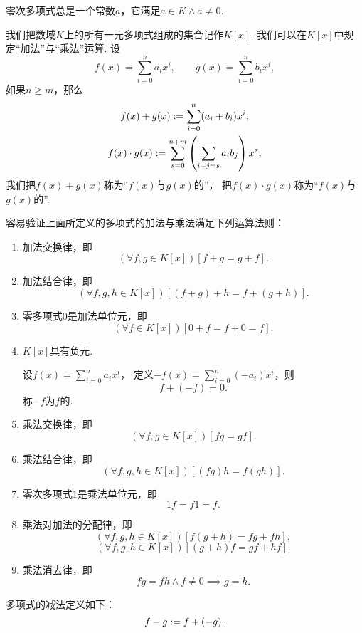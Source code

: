 零次多项式总是一个常数\(a\)，它满足\(a \in K \land a \neq 0\).

我们把数域\(K\)上的所有一元多项式组成的集合记作\(K[x]\).
我们可以在\(K[x]\)中规定“加法”与“乘法”运算.
设\[
	f(x) = \sum_{i=0}^n a_i x^i, \qquad
	g(x) = \sum_{i=0}^n b_i x^i,
\]
如果\(n \ge m\)，那么\begin{gather}
	f(x) + g(x) := \sum_{i=0}^n (a_i+b_i) x^i, \\
	f(x) \cdot g(x) := \sum_{s=0}^{n+m} \left( \sum_{i+j=s} a_i b_j \right) x^s,
\end{gather}
我们把\(f(x)+g(x)\)称为“\(f(x)\)与\(g(x)\)的”，
把\(f(x) \cdot g(x)\)称为“\(f(x)\)与\(g(x)\)的”.

容易验证上面所定义的多项式的加法与乘法满足下列运算法则：
\begin{enumerate}
	\item 加法交换律，即\[
		(\forall f,g \in K[x])[f+g=g+f].
	\]

	\item 加法结合律，即\[
		(\forall f,g,h \in K[x])[(f+g)+h=f+(g+h)].
	\]

	\item 零多项式\(0\)是加法单位元，即\[
		(\forall f \in K[x])[0+f=f+0=f].
	\]

	\item \(K[x]\)具有负元.

	设\(f(x)=\sum_{i=0}^n a_i x^i\)，
	定义\(-f(x)=\sum_{i=0}^n (-a_i) x^i\)，则\[
		f+(-f)=0.
	\]
	称\(-f\)为\(f\)的.

	\item 乘法交换律，即\[
		(\forall f,g \in K[x])[fg=gf].
	\]

	\item 乘法结合律，即\[
		(\forall f,g,h \in K[x])[(fg)h=f(gh)].
	\]

	\item 零次多项式\(1\)是乘法单位元，即\[
		1f=f1=f.
	\]

	\item 乘法对加法的分配律，即\[
		(\forall f,g,h \in K[x])[f(g+h)=fg+fh],
	\]\[
		(\forall f,g,h \in K[x])[(g+h)f=gf+hf].
	\]

	\item 乘法消去律，即\[
		fg=fh \land f\neq0 \implies g=h.
	\]
\end{enumerate}

多项式的减法定义如下：\begin{equation}
	f-g := f+(-g).
\end{equation}

